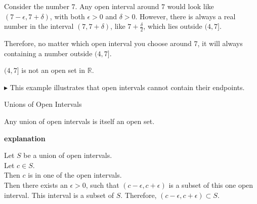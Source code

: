 \documentclass{ximera}
\begin{document}
\begin{example}
\begin{image}
  \end{image}








Consider the number $7$.  Any open interval around $7$ would look like $(7 - \epsilon, 7 + \delta)$, with both $\epsilon > 0$  and $\delta > 0$.  However, there is always a real number in the interval $(7, 7 + \delta)$, like $7 + \frac{\delta}{2}$, which lies outside $(4, 7]$.

Therefore, no matter which open interval you choose around $7$, it will always containing a number outside $(4, 7]$.

$(4, 7]$  is not an open set in $\mathbb{R}$.


\end{example}

$\blacktriangleright$ This example illustrates that open intervals cannot contain their endpoints. 






\begin{example}  Unions of Open Intervals


Any union of open intervals is itself an open set.



\textbf{\textcolor{red!75!green}{explanation}} 

Let $S$ be a union of open intervals.  \\
Let $c \in S$. \\
Then $c$ is in one of the open intervals. \\
Then there exists an $\epsilon > 0$, such that $(c - \epsilon, c + \epsilon)$ is a subset of this one open interval.  This interval is a subset of $S$.  Therefore, $(c - \epsilon, c + \epsilon) \subset S$. 




\end{example}
\end{document}
